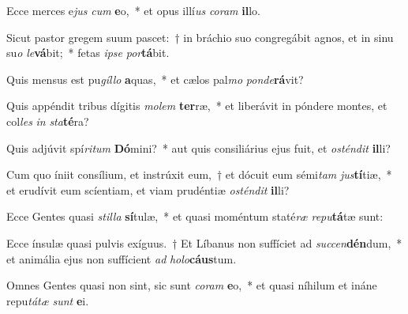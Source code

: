 \item Ecce merces e\textit{jus} \textit{cum} \textbf{e}o,~* et opus illí\textit{us} \textit{co}\textit{ram} \textbf{il}lo.
\item Sicut pastor gregem suum pascet:~† in bráchio suo congregábit agnos, et in sinu su\textit{o} \textit{le}\textbf{vá}bit;~* fetas \textit{ip}\textit{se} \textit{por}\textbf{tá}bit.
\item Quis mensus est pu\textit{gíl}\textit{lo} \textbf{a}quas,~* et cælos pal\textit{mo} \textit{pon}\textit{de}\textbf{rá}vit?
\item Quis appéndit tribus dígitis \textit{mo}\textit{lem} \textbf{ter}ræ,~* et liberávit in póndere montes, et col\textit{les} \textit{in} \textit{sta}\textbf{té}ra?
\item Quis adjúvit spí\textit{ri}\textit{tum} \textbf{Dó}mini?~* aut quis consiliárius ejus fuit, et \textit{os}\textit{tén}\textit{dit} \textbf{il}li?
\item Cum quo íniit consílium, et instrúxit eum,~† et dócuit eum sémi\textit{tam} \textit{jus}\textbf{tí}tiæ,~* et erudívit eum scíentiam, et viam prudéntiæ \textit{os}\textit{tén}\textit{dit} \textbf{il}li?
\item Ecce Gentes quasi \textit{stil}\textit{la} \textbf{sí}tulæ,~* et quasi moméntum staté\textit{ræ} \textit{re}\textit{pu}\textbf{tá}tæ sunt:
\item Ecce ínsulæ quasi pulvis exíguus.~† Et Líbanus non suffíciet ad \textit{suc}\textit{cen}\textbf{dén}dum,~* et animália ejus non suffícient \textit{ad} \textit{ho}\textit{lo}\textbf{cáus}tum.
\item Omnes Gentes quasi non sint, sic sunt \textit{co}\textit{ram} \textbf{e}o,~* et quasi níhilum et ináne repu\textit{tá}\textit{tæ} \textit{sunt} \textbf{e}i.
